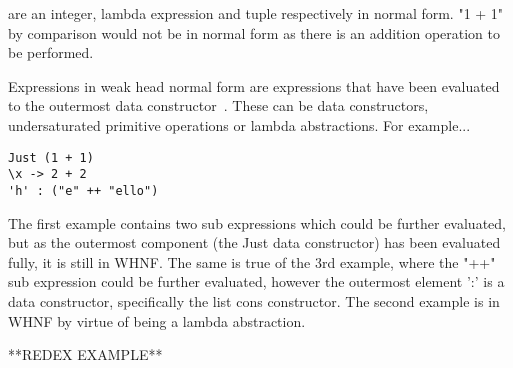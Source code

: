 are an integer, lambda expression and tuple respectively in normal form. "1 + 1"
by comparison would not be in normal form as there is an addition operation to
be performed.

Expressions in weak head normal form are expressions that have been evaluated
to the outermost data constructor~\cite[pp.198]{SPJ}. These can be data constructors, undersaturated
primitive operations or lambda abstractions. For example...
\begin{verbatim}
Just (1 + 1)
\x -> 2 + 2
'h' : ("e" ++ "ello")
\end{verbatim}
The first example contains two sub expressions which could be further evaluated,
but as the outermost component (the Just data constructor) has been evaluated 
fully, it is still in WHNF. The same is true of the 3rd example, where the "++"
sub expression could be further evaluated, however the outermost element
':' is a data constructor, specifically the list cons constructor. The second
example is in WHNF by virtue of being a lambda abstraction.


**REDEX EXAMPLE**

